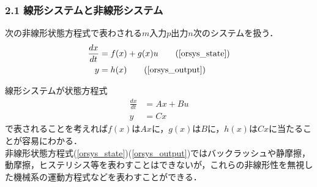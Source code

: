 \begin{frame}[t]
\frametitle{2.1 線形システムと非線形システム}
次の非線形状態方程式で表わされる$m$入力$p$出力$n$次のシステムを扱う．
\begin{align}
 \frac{dx}{dt} &= f(x) + g(x) u \tag{\ref{orsys_state}} \\
 y             &= h(x) \tag{\ref{orsys_output}}
\end{align}

線形システムが状態方程式
\begin{align}
	\frac{dx}{dt} & =  A x  + B u \\
	y & =  C x
\end{align}
で表されることを考えれば$f(x)$は$Ax$に，$g(x)$は$B$に，$h(x)$は$Cx$に当たることが容易にわかる．\\
非線形状態方程式(\ref{orsys_state})(\ref{orsys_output})ではバックラッシュや静摩擦，動摩擦，ヒステリシス等を表わすことはできないが，これらの非線形性を無視した機械系の運動方程式などを表わすことができる．
\end{frame}

